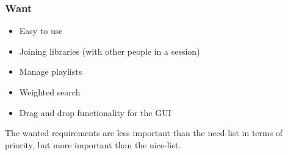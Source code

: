 \subsubsection{Want}


\begin{itemize}
	\item Easy to use 
	\item Joining libraries (with other people in a session)
	\item Manage playlists
	\item Weighted search
	\item Drag and drop functionality for the GUI
\end{itemize}


The wanted requirements are less important than the need-list in terms of priority, but more
important than the nice-list.